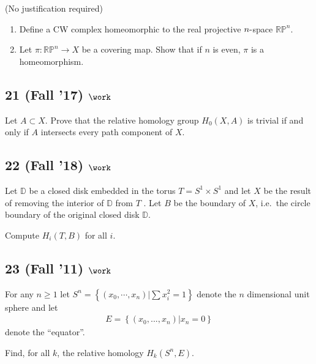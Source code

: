 (No justification required)

\begin{enumerate}
\def\labelenumi{\alph{enumi}.}
\setcounter{enumi}{1}
\item
  Define a CW complex homeomorphic to the real projective
  \(n{\hbox{-}}\)space \({\mathbb{RP}}^n\).
\item
  Let \(\pi : {\mathbb{RP}}^n \to X\) be a covering map. Show that if
  \(n\) is even, \(\pi\) is a homeomorphism.
\end{enumerate}

\hypertarget{fall-17-work-3}{%
\subsection{\texorpdfstring{21 (Fall '17)
\(\work\)}{21 (Fall '17) \textbackslash work}}\label{fall-17-work-3}}

Let \(A \subset X\). Prove that the relative homology group
\(H_0 (X, A)\) is trivial if and only if \(A\) intersects every path
component of \(X\).

\hypertarget{fall-18-work-7}{%
\subsection{\texorpdfstring{22 (Fall '18)
\(\work\)}{22 (Fall '18) \textbackslash work}}\label{fall-18-work-7}}

Let \({\mathbb{D}}\) be a closed disk embedded in the torus
\(T = S^1 \times S^1\) and let \(X\) be the result of removing the
interior of \({\mathbb{D}}\) from \(T\) . Let \(B\) be the boundary of
\(X\), i.e.~the circle boundary of the original closed disk
\({\mathbb{D}}\).

Compute \(H_i (T, B)\) for all \(i\).

\hypertarget{fall-11-work-2}{%
\subsection{\texorpdfstring{23 (Fall '11)
\(\work\)}{23 (Fall '11) \textbackslash work}}\label{fall-11-work-2}}

For any \(n \geq 1\) let
\(S^n = \left\{{(x_0 , \cdots , x_n )\mathrel{\Big|}\sum x_i^2 =1}\right\}\)
denote the \(n\) dimensional unit sphere and let
\begin{align*}E = \left\{{(x_0 , . . . , x_n )\mathrel{\Big|}x_n = 0}\right\}\end{align*}
denote the ``equator''.

Find, for all \(k\), the relative homology \(H_k (S^n , E)\).

